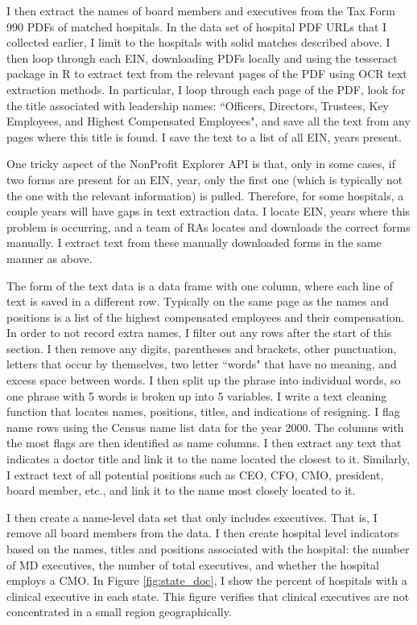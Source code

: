 \documentclass[12pt]{article}
\begin{document}
I then extract the names of board members and executives from the Tax Form 990 PDFs of matched hospitals. In the data set of hospital PDF URLs that I collected earlier, I limit to the hospitals with solid matches described above. I then loop through each EIN, downloading PDFs locally and using the tesseract package in R to extract text from the relevant pages of the PDF using OCR text extraction methods. In particular, I loop through each page of the PDF, look for the title associated with leadership names: ``Officers, Directors, Trustees, Key Employees, and Highest Compensated Employees", and save all the text from any pages where this title is found. I save the text to a list of all EIN, years present. 

One tricky aspect of the NonProfit Explorer API is that, only in some cases, if two forms are present for an EIN, year, only the first one (which is typically not the one with the relevant information) is pulled. Therefore, for some hospitals, a couple years will have gaps in text extraction data. I locate EIN, years where this problem is occurring, and a team of RAs locates and downloads the correct forms manually. I extract text from these manually downloaded forms in the same manner as above. 

The form of the text data is a data frame with one column, where each line of text is saved in a different row. Typically on the same page as the names and positions is a list of the highest compensated employees and their compensation. In order to not record extra names, I filter out any rows after the start of this section. I then remove any digits, parentheses and brackets, other punctuation, letters that occur by themselves, two letter ``words" that have no meaning, and excess space between words. I then split up the phrase into individual words, so one phrase with 5 words is broken up into 5 variables. I write a text cleaning function that locates names, positions, titles, and indications of resigning. I flag name rows using the Census name list data for the year 2000. The columns with the most flags are then identified as name columns. I then extract any text that indicates a doctor title and link it to the name located the closest to it. Similarly, I extract text of all potential positions such as CEO, CFO, CMO, president, board member, etc., and link it to the name most closely located to it. 

I then create a name-level data set that only includes executives. That is, I remove all board members from the data. I then create hospital level indicators based on the names, titles and positions associated with the hospital: the number of MD executives, the number of total executives, and whether the hospital employs a CMO. In Figure \ref{fig:state_doc}, I show the percent of hospitals with a clinical executive in each state. This figure verifies that clinical executives are not concentrated in a small region geographically. 
\end{document}
